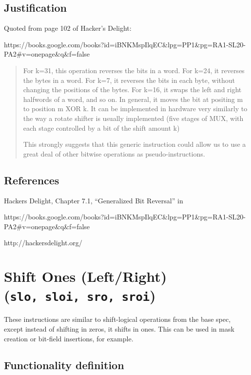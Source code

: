 \subsection{Justification}

Quoted from page 102 of Hacker's Delight:

https://books.google.com/books?id=iBNKMspIlqEC\&lpg=PP1\&pg=RA1-SL20-PA2\#v=onepage\&q\&f=false

\begin{quote}
For k=31, this operation reverses the bits in a word. For k=24, it
reverses the bytes in a word. For k=7, it reverses the bits in each
byte, without changing the positions of the bytes. For k=16, it swaps
the left and right halfwords of a word, and so on. In general, it moves
the bit at positing m to position m XOR k. It can be implemented in
hardware very similarly to the way a rotate shifter is usually
implemented (five stages of MUX, with each stage controlled by a bit of
the shift amount k)

This strongly suggests that this generic instruction could allow us to
use a great deal of other bitwise operations as pseudo-instructions.
\end{quote}

\subsection{References}

Hackers Delight, Chapter 7.1, ``Generalized Bit Reversal'' in

https://books.google.com/books?id=iBNKMspIlqEC\&lpg=PP1\&pg=RA1-SL20-PA2\#v=onepage\&q\&f=false

http://hackersdelight.org/


\section{Shift Ones (Left/Right) (\texttt{slo,\ sloi,\ sro,\ sroi})}

These instructions are similar to shift-logical operations from the base
spec, except instead of shifting in zeros, it shifts in ones. This can
be used in mask creation or bit-field insertions, for example.

\subsection{Functionality definition}

